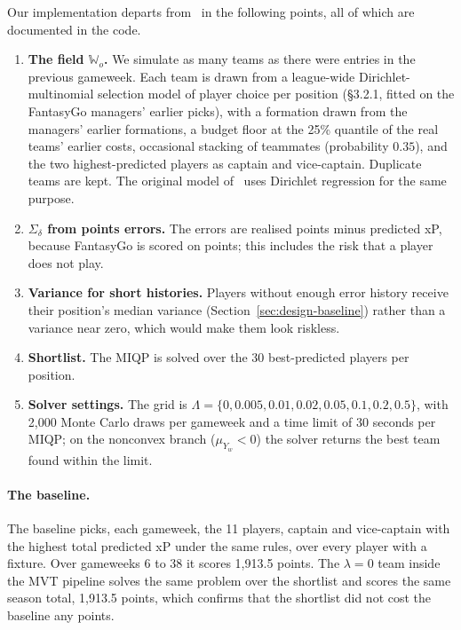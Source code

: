 \documentclass[12pt,oneside,a4paper]{book}
\theoremstyle{definition}
\theoremstyle{remark}
\begin{document}
	Our implementation departs from~\cite{haugh2021} in the following points, all of which are
	documented in the code.
	\begin{enumerate}
		\item \textbf{The field $\mathbb{W}_o$.} We simulate as many teams as there were entries in the
		previous gameweek. Each team is drawn from a league-wide Dirichlet-multinomial selection
		model of player choice per position (§3.2.1, fitted on the FantasyGo managers' earlier
		picks), with a formation drawn from the managers' earlier formations, a budget floor
		at the 25\% quantile of the real teams' earlier costs, occasional stacking of teammates
		(probability $0.35$), and the two highest-predicted players as captain and vice-captain.
		Duplicate teams are kept. The original model of~\cite{haugh2021} uses Dirichlet
		regression for the same purpose.
		\item \textbf{$\Sigma_\delta$ from points errors.} The errors are realised points minus
		predicted xP, because FantasyGo is scored on points; this includes the risk that a player
		does not play.
		\item \textbf{Variance for short histories.} Players without enough error history receive
		their position's median variance (Section~\ref{sec:design-baseline}) rather than a
		variance near zero, which would make them look riskless.
		\item \textbf{Shortlist.} The MIQP is solved over the 30 best-predicted players per position.
		\item \textbf{Solver settings.} The grid is
		$\Lambda=\{0, 0.005, 0.01, 0.02, 0.05, 0.1, 0.2, 0.5\}$, with 2{,}000 Monte Carlo
		draws per gameweek and a time limit of 30 seconds per MIQP; on the nonconvex branch
		($\mu_{Y_w}<0$) the solver returns the best team found within the limit.
	\end{enumerate}

	\paragraph{The baseline.} The baseline picks, each gameweek, the 11 players, captain and
	vice-captain with the highest total predicted xP under the same rules, over every player with a
	fixture. Over gameweeks 6 to 38 it scores 1{,}913.5 points. The $\lambda=0$ team inside the MVT
	pipeline solves the same problem over the shortlist and scores the same season total, 1{,}913.5
	points, which confirms that the shortlist did not cost the baseline any points.
\end{document}
